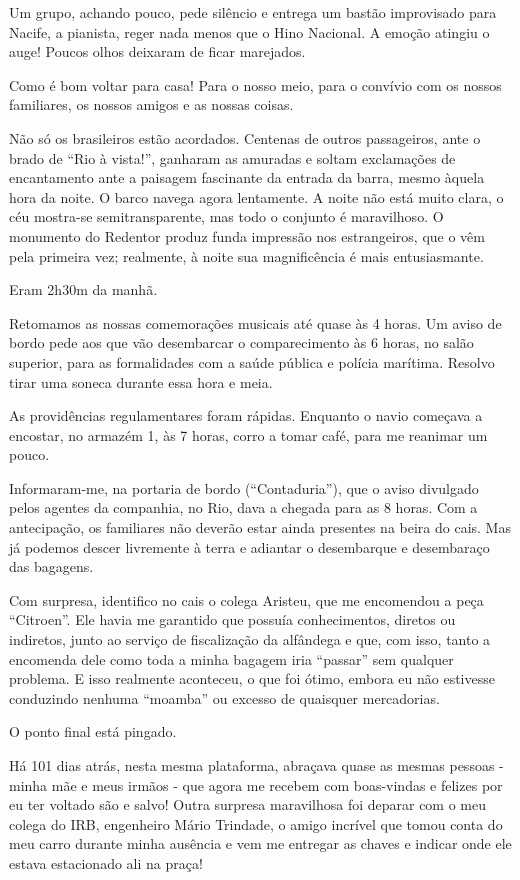 Um grupo, achando pouco, pede silêncio e entrega um bastão improvisado para Nacife, a pianista, reger nada menos que o Hino Nacional. A emoção atingiu o auge! Poucos olhos deixaram de ficar marejados.

Como é bom voltar para casa! Para o nosso meio, para o convívio com os nossos familiares, os nossos amigos e as nossas coisas.

Não só os brasileiros estão acordados. Centenas de outros passageiros, ante o brado de “Rio à vista!”, ganharam as amuradas e soltam exclamações de encantamento ante a paisagem fascinante da entrada da barra, mesmo àquela hora da noite. O barco navega agora lentamente. A noite não está muito clara, o céu mostra-se semitransparente, mas todo o conjunto é maravilhoso. O monumento do Redentor produz funda impressão nos estrangeiros, que o vêm pela primeira vez; realmente, à noite sua magnificência é mais entusiasmante.

Eram 2h30m da manhã.

Retomamos as nossas comemorações musicais até quase às 4 horas. Um aviso de bordo pede aos que vão desembarcar o comparecimento às 6 horas, no salão superior, para as formalidades com a saúde pública e polícia marítima. Resolvo tirar uma soneca durante essa hora e meia.

As providências regulamentares foram rápidas. Enquanto o navio começava a encostar, no armazém 1, às 7 horas, corro a tomar café, para me reanimar um pouco.

Informaram-me, na portaria de bordo (“Contaduria”), que o aviso divulgado pelos agentes da companhia, no Rio, dava a chegada para as 8 horas. Com a antecipação, os familiares não deverão estar ainda presentes na beira do cais. Mas já podemos descer livremente à terra e adiantar o desembarque e desembaraço das bagagens.

Com surpresa, identifico no cais o colega Aristeu, que me encomendou a peça “Citroen”. Ele havia me garantido que possuía conhecimentos, diretos ou indiretos, junto ao serviço de fiscalização da alfândega e que, com isso, tanto a encomenda dele como toda a minha bagagem iria “passar” sem qualquer problema. E isso realmente aconteceu, o que foi ótimo, embora eu não estivesse conduzindo nenhuma “moamba” ou excesso de quaisquer mercadorias.

O ponto final está pingado.

Há 101 dias atrás, nesta mesma plataforma, abraçava quase as mesmas pessoas - minha mãe e meus irmãos - que agora me recebem com boas-vindas e felizes por eu ter voltado são e salvo! Outra surpresa maravilhosa foi deparar com o meu colega do IRB, engenheiro Mário Trindade, o amigo incrível que tomou conta do meu carro durante minha ausência e vem me entregar as chaves e indicar onde ele estava estacionado ali na praça!

